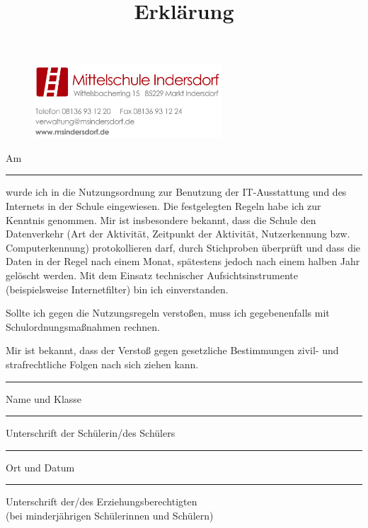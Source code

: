 \documentclass[a4paper, parskip]{scrartcl}
\title{Erklärung}
\date{}
\begin{document}
\thispagestyle{empty}

\begin{figure}
	\flushright
	\includegraphics[width=7cm]{logo_briefkopf}
	\vspace{4cm}
\end{figure}


Am \rule{2cm}{.3pt} wurde ich in die Nutzungsordnung zur Benutzung der
IT-Ausstattung und des Internets in der Schule eingewiesen. Die festgelegten
Regeln habe ich zur Kenntnis genommen. Mir ist insbesondere bekannt, dass die
Schule den Datenverkehr (Art der Aktivität, Zeitpunkt der Aktivität,
Nutzerkennung bzw. Computerkennung) protokollieren darf, durch Stichproben
überprüft und dass die Daten in der Regel nach einem Monat, spätestens jedoch
nach einem halben Jahr gelöscht werden. Mit dem Einsatz technischer
Aufsichtsinstrumente (beispielsweise Internetfilter) bin ich einverstanden.

Sollte ich gegen die Nutzungsregeln verstoßen, muss ich gegebenenfalls mit
Schulordnungsmaßnahmen rechnen.

Mir ist bekannt, dass der Verstoß gegen gesetzliche Bestimmungen zivil- und
strafrechtliche Folgen nach sich ziehen kann. \\
\vspace{2cm}

\parbox{6cm}{\hrule
\strut \footnotesize Name und Klasse}
\hfill\parbox{7cm}{\hrule
\strut \footnotesize Unterschrift der Schülerin/des Schülers}

\parbox{6cm}{\hrule
\strut \footnotesize Ort und Datum}
\hfill\parbox{7cm}{\hrule
\strut \footnotesize Unterschrift der/des Erziehungsberechtigten \\(bei
minderjährigen Schülerinnen und Schülern)}
\end{document}
